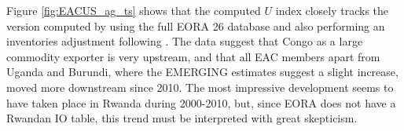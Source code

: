 \documentclass[a4paper]{article}
\begin{document}

Figure \ref{fig:EACUS_ag_ts} shows that the computed $U$ index closely tracks the version computed by \citep{mancini2023positioning} using the full EORA 26 database and also performing an inventories adjustment following \citet{antras2018measurement}. The data suggest that Congo as a large commodity exporter is very upstream, and that all EAC members apart from Uganda and Burundi, where the EMERGING estimates suggest a slight increase, moved more downstream since 2010. The most impressive development seems to have taken place in Rwanda during 2000-2010, but, since EORA does not have a Rwandan IO table, this trend must be interpreted with great skepticism. \newline
\end{document}
